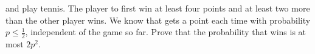  and  play tennis. The player to first win at least four points and at least two more than the other player wins. We know that  gets a point each time with probability $p\le \frac12$, independent of the game so far. Prove that the probability that  wins is at most $2p^2$.
